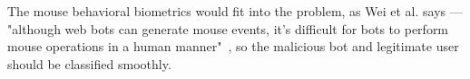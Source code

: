 The mouse behavioral biometrics would fit into the problem, as Wei et al. says --- "although web bots can generate mouse events, it’s difficult for bots to perform mouse operations in a human manner"~\cite{a-deep-learning-approach-to-web-bot-detection-using-mouse-behavioral-biometrics}, so the malicious bot and legitimate user should be classified smoothly.